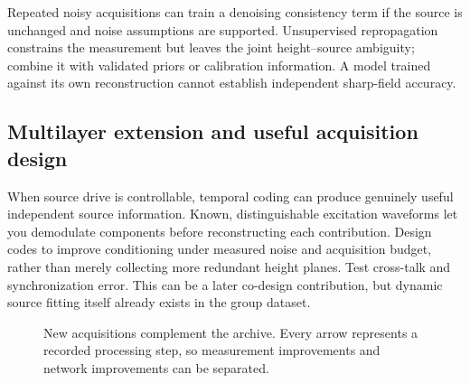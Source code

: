 Repeated noisy acquisitions can train a denoising consistency term if the source is unchanged and noise assumptions are supported. Unsupervised repropagation constrains the measurement but leaves the joint height--source ambiguity; combine it with validated priors or calibration information. A model trained against its own reconstruction cannot establish independent sharp-field accuracy.

\subsection{Multilayer extension and useful acquisition design}
When source drive is controllable, temporal coding can produce genuinely useful independent source information. Known, distinguishable excitation waveforms let you demodulate components before reconstructing each contribution. Design codes to improve conditioning under measured noise and acquisition budget, rather than merely collecting more redundant height planes. Test cross-talk and synchronization error. This can be a later co-design contribution, but dynamic source fitting itself already exists in the group dataset.

\begin{figure}[htbp]\centering
{}
\caption{New acquisitions complement the archive. Every arrow represents a recorded processing step, so measurement improvements and network improvements can be separated.}
\end{figure}

